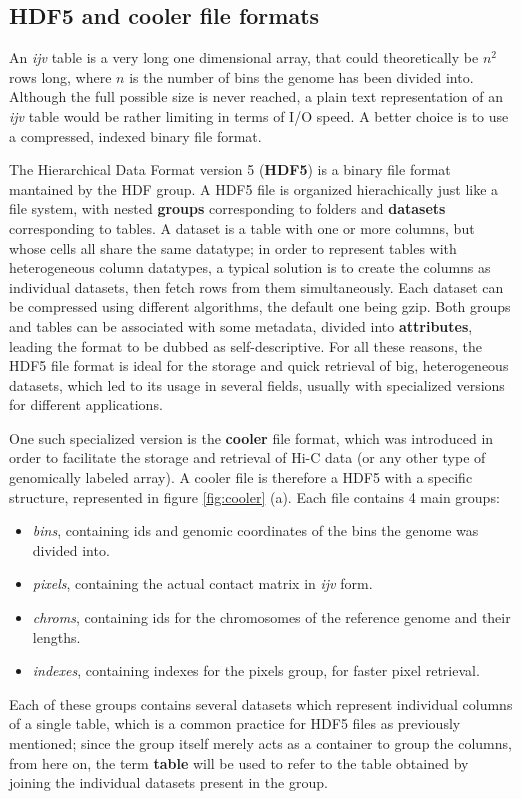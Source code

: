 \subsection{HDF5 and cooler file formats}
An \emph{ijv} table is a very long one dimensional array, that could theoretically be $n^2$ rows long, where $n$ is the number of bins the genome has been divided into. Although the full possible size is never reached, a plain text representation of an \emph{ijv} table would be rather limiting in terms of I/O speed. A better choice is to use a compressed, indexed binary file format. 

The Hierarchical Data Format version 5 (\textbf{HDF5}) is a binary file format mantained by the HDF group\cite{hdfgroup}. A HDF5 file is organized hierachically just like a file system, with nested \textbf{groups} corresponding to folders and \textbf{datasets} corresponding to tables. A dataset is a table with one or more columns, but whose cells all share the same datatype; in order to represent tables with heterogeneous column datatypes, a typical solution is to create the columns as individual datasets, then fetch rows from them simultaneously. Each dataset can be compressed using different algorithms, the default one being gzip. Both groups and tables can be associated with some metadata, divided into \textbf{attributes}, leading the format to be dubbed as self-descriptive. For all these reasons, the HDF5 file format is ideal for the storage and quick retrieval of big, heterogeneous datasets, which led to its usage in several fields, usually with specialized versions for different applications.

One such specialized version is the \textbf{cooler} file format, which was introduced in order to facilitate the storage and retrieval of Hi-C data (or any other type of genomically labeled array)\cite{cooler2020}. A cooler file is therefore a HDF5 with a specific structure, represented in figure \ref{fig:cooler} (a). Each file contains 4 main groups:
\begin{itemize}\tightlist
  \item \emph{bins}, containing ids and genomic coordinates of the bins the genome was divided into.
  \item \emph{pixels}, containing the actual contact matrix in \emph{ijv} form.
  \item \emph{chroms}, containing ids for the chromosomes of the reference genome and their lengths.
  \item \emph{indexes}, containing indexes for the pixels group, for faster pixel retrieval.
\end{itemize}
Each of these groups contains several datasets which represent individual columns of a single table, which is a common practice for HDF5 files as previously mentioned; since the group itself merely acts as a container to group the columns, from here on, the term \textbf{table} will be used to refer to the table obtained by joining the individual datasets present in the group.

